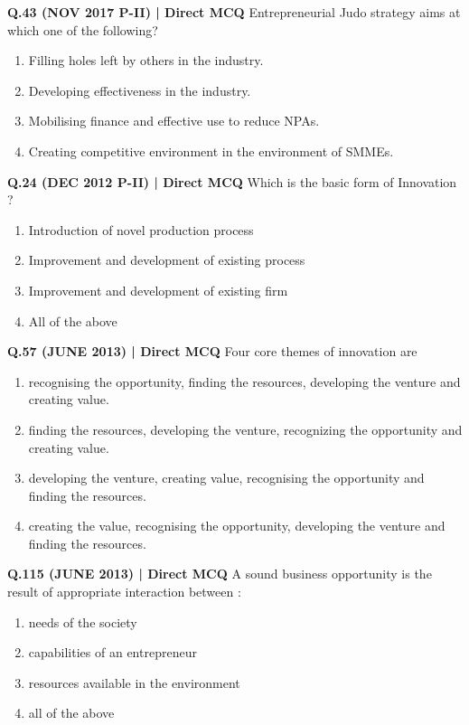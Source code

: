 \documentclass{article}
\begin{document}
\textbf{Q.43 (NOV 2017 P-II) | Direct MCQ}
Entrepreneurial Judo strategy aims at which one of the following?
\begin{enumerate}[label=(\arabic*)]
    \item Filling holes left by others in the industry.
    \item Developing effectiveness in the industry.
    \item Mobilising finance and effective use to reduce NPAs.
    \item Creating competitive environment in the environment of SMMEs.
\end{enumerate}

\textbf{Q.24 (DEC 2012 P-II) | Direct MCQ}
Which is the basic form of Innovation ?
\begin{enumerate}[label=(\arabic*)]
    \item Introduction of novel production process
    \item Improvement and development of existing process
    \item Improvement and development of existing firm
    \item All of the above
\end{enumerate}

\textbf{Q.57 (JUNE 2013) | Direct MCQ}
Four core themes of innovation are
\begin{enumerate}[label=(\arabic*)]
    \item recognising the opportunity, finding the resources, developing the venture and creating value.
    \item finding the resources, developing the venture, recognizing the opportunity and creating value.
    \item developing the venture, creating value, recognising the opportunity and finding the resources.
    \item creating the value, recognising the opportunity, developing the venture and finding the resources.
\end{enumerate}

\textbf{Q.115 (JUNE 2013) | Direct MCQ}
A sound business opportunity is the result of appropriate interaction between :
\begin{enumerate}[label=(\arabic*)]
    \item needs of the society
    \item capabilities of an entrepreneur
    \item resources available in the environment
    \item all of the above
\end{enumerate}
\end{document}
